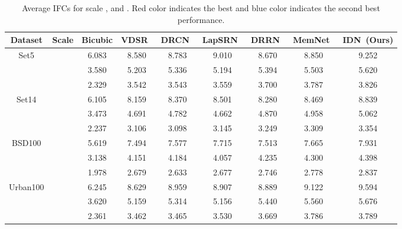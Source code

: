 \documentclass[10pt,twocolumn,letterpaper]{article}
\begin{document}
\begin{table*}[htb]
	\small
	\centering
	\begin{tabular}{|c|c|c|c|c|c|c|c||c|}
		\hline
		Dataset & Scale & Bicubic & VDSR~\cite{VDSR} & DRCN~\cite{DRCN} & LapSRN~\cite{LapSRN} & DRRN~\cite{DRRN} & MemNet~\cite{MemNet} & IDN~(Ours) \\
		\hline
		\hline
		\multirow{3}{*}{Set5} &  & 6.083 & 8.580 & 8.783 & \textcolor[rgb]{0.00,0.07,1.00}{9.010} & 8.670 & 8.850 & \textcolor[rgb]{1.00,0.00,0.00}{9.252} \\
		&  & 3.580 & 5.203 & 5.336 & 5.194 & 5.394 & \textcolor[rgb]{0.00,0.07,1.00}{5.503} & \textcolor[rgb]{1.00,0.00,0.00}{5.620} \\
		&  & 2.329 & 3.542 & 3.543 & 3.559 & 3.700 & \textcolor[rgb]{0.00,0.07,1.00}{3.787} & \textcolor[rgb]{1.00,0.00,0.00}{3.826} \\
		\hline
		\hline
		\multirow{3}{*}{Set14} &  & 6.105 & 8.159 & 8.370 & \textcolor[rgb]{0.00,0.07,1.00}{8.501} & 8.280 & 8.469 & \textcolor[rgb]{1.00,0.00,0.00}{8.839} \\
		&  & 3.473 & 4.691 & 4.782 & 4.662 & 4.870 & \textcolor[rgb]{0.00,0.07,1.00}{4.958} & \textcolor[rgb]{1.00,0.00,0.00}{5.062} \\
		&  & 2.237 & 3.106 & 3.098 & 3.145 & 3.249 & \textcolor[rgb]{0.00,0.07,1.00}{3.309} & \textcolor[rgb]{1.00,0.00,0.00}{3.354} \\
		\hline
		\hline
		
		\multirow{3}{*}{BSD100} &  & 5.619 & 7.494 & 7.577 & \textcolor[rgb]{0.00,0.07,1.00}{7.715} & 7.513 & 7.665 & \textcolor[rgb]{1.00,0.00,0.00}{7.931} \\
		&  & 3.138 & 4.151 & 4.184 & 4.057 & 4.235 & \textcolor[rgb]{0.00,0.07,1.00}{4.300} & \textcolor[rgb]{1.00,0.00,0.00}{4.398} \\
		&  & 1.978 & 2.679 & 2.633 & 2.677 & 2.746 & \textcolor[rgb]{0.00,0.07,1.00}{2.778} & \textcolor[rgb]{1.00,0.00,0.00}{2.837} \\
		\hline
		\hline
		
		\multirow{3}{*}{Urban100} &  & 6.245 & 8.629 & 8.959 & 8.907 & 8.889 & \textcolor[rgb]{0.00,0.07,1.00}{9.122} & \textcolor[rgb]{1.00,0.00,0.00}{9.594} \\
		&  & 3.620 & 5.159 & 5.314 & 5.156 & 5.440 & \textcolor[rgb]{0.00,0.07,1.00}{5.560} & \textcolor[rgb]{1.00,0.00,0.00}{5.676} \\
		&  & 2.361 & 3.462 & 3.465 & 3.530 & 3.669 & \textcolor[rgb]{0.00,0.07,1.00}{3.786} & \textcolor[rgb]{1.00,0.00,0.00}{3.789} \\
		\hline
	\end{tabular}
	\caption{Average IFCs for scale ,  and . Red color indicates the best and blue color indicates the second best performance.}
	\label{tab:ifc}
\end{table*}
\end{document}
